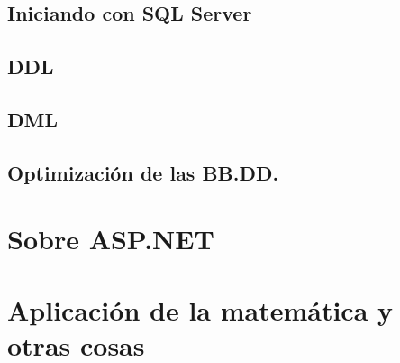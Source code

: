 \documentclass[12pt,spanish,lettersize]{book}
\begin{document}
\section{Iniciando con SQL Server}
\section{DDL}
\section{DML}
\section{Optimizaci\'on de las BB.DD.}
\chapter{Sobre ASP.NET}
\chapter{Aplicaci\'on de la matem\'atica y otras cosas}
\end{document}
